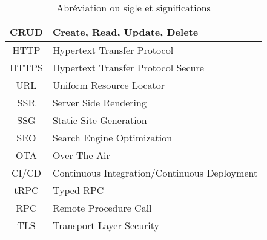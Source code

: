 \begin{table}[h!]
\begin{tabular}{|c|m{11cm}|}
        \hline
        CRUD & Create, Read, Update, Delete \\
        \hline
        HTTP & Hypertext Transfer Protocol \\
        \hline
        HTTPS & Hypertext Transfer Protocol Secure \\
        \hline
        URL & Uniform Resource Locator \\
        \hline
        SSR & Server Side Rendering \\
        \hline
        SSG & Static Site Generation \\
        \hline
        SEO & Search Engine Optimization \\
        \hline
        OTA & Over The Air \\
        \hline
        CI/CD & Continuous Integration/Continuous Deployment \\
        \hline
        tRPC & Typed RPC \\
        \hline
        RPC & Remote Procedure Call \\
        \hline
        TLS & Transport Layer Security \\
        \hline
    \end{tabular}
    \caption{Abréviation ou sigle et significations}
\end{table}
